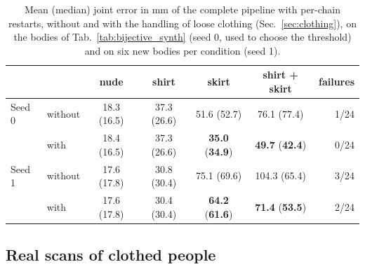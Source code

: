 \documentclass[11pt]{article}
\begin{document}
\begin{table}[t]
  \centering
  \caption{Mean (median) joint error in mm of the complete pipeline with
  per-chain restarts, without and with the handling of loose clothing
  (Sec.~\ref{sec:clothing}), on the bodies of Tab.~\ref{tab:bijective_synth}
  (seed 0, used to choose the threshold) and on six new bodies per condition
  (seed 1).}
  \label{tab:clothing_synth}
  \small
  \begin{tabular}{llccccr}
    \toprule
    & & nude & shirt & skirt & shirt + skirt & failures \\
    \midrule
    Seed 0 & without & 18.3 (16.5) & 37.3 (26.6) & 51.6 (52.7) & 76.1 (77.4) & 1/24 \\
           & with    & 18.4 (16.5) & 37.3 (26.6) & \textbf{35.0} (\textbf{34.9}) & \textbf{49.7} (\textbf{42.4}) & 0/24 \\
    \midrule
    Seed 1 & without & 17.6 (17.8) & 30.8 (30.4) & 75.1 (69.6) & 104.3 (65.4) & 3/24 \\
           & with    & 17.6 (17.8) & 30.4 (30.4) & \textbf{64.2} (\textbf{61.6}) & \textbf{71.4} (\textbf{53.5}) & 2/24 \\
    \bottomrule
  \end{tabular}
\end{table}

\subsection{Real scans of clothed people}
\label{sec:exp_real}
\end{document}
